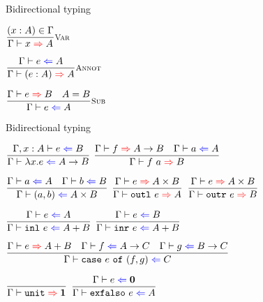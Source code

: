 \documentclass{beamer}
\newcommand{\Fun}[2]{#1 \to #2}
\newcommand{\Prod}[2]{#1 \times #2}
\newcommand{\Sum}[2]{#1 + #2}
\newcommand{\Unit}{\textbf{1}}
\newcommand{\Empty}{\textbf{0}}
\newcommand{\annot}[2]{(#1 : #2)}
\newcommand{\fun}[2]{\lambda #1. #2}
\newcommand{\app}[2]{#1\ #2}
\newcommand{\pair}[2]{(#1, #2)}
\newcommand{\outl}[1][]{\texttt{outl}\ #1}
\newcommand{\outr}[1][]{\texttt{outr}\ #1}
\newcommand{\inl}[1][]{\texttt{inl}\ #1}
\newcommand{\inr}[1][]{\texttt{inr}\ #1}
\newcommand{\case}[3]{\texttt{case}\ #1\ \texttt{of}\ (#2, #3)}
\newcommand{\unit}{\texttt{unit}}
\newcommand{\exfalso}[1][]{\texttt{exfalso}\ #1}
\newcommand{\infrule}[3][]{\displaystyle \frac{#2}{#3} \textsc{\footnotesize{#1}}}
\newcommand{\extend}[3]{#1, #2 : #3}
\newcommand{\sidecond}[1]{#1}
\begin{document}
\newcommand{\fullinfer}[3]{#1 \vdash #2 \mathcolor{red}{\Rightarrow} #3}
\newcommand{\infer}[2]{\fullinfer{\Gamma}{#1}{#2}}

\begin{frame}{Bidirectional typing}

\begin{center}
  $\infrule[Var]{\sidecond{(x : A) \in \Gamma}}{\infer{x}{A}}$

  \vspace{2em}

  $\infrule[Annot]{\check{e}{A}}{\infer{\annot{e}{A}}{A}}$

  \vspace{2em}

  $\infrule[Sub]{\infer{e}{B} \quad \sidecond{A = B}}{\check{e}{A}}$
\end{center}

\end{frame}

\begin{frame}{Bidirectional typing}

\begin{center}
  $\infrule{\fullcheck{\extend{\Gamma}{x}{A}}{e}{B}}{\check{\fun{x}{e}}{\Fun{A}{B}}}$ \quad
  $\infrule{\infer{f}{\Fun{A}{B}} \quad \check{a}{A}}{\infer{\app{f}{a}}{B}}$

  \vspace{2em}

  $\infrule{\check{a}{A} \quad \check{b}{B}}{\check{\pair{a}{b}}{\Prod{A}{B}}}$ \quad
  $\infrule{\infer{e}{\Prod{A}{B}}}{\infer{\outl[e]}{A}}$ \quad
  $\infrule{\infer{e}{\Prod{A}{B}}}{\infer{\outr[e]}{B}}$

  \vspace{2em}

  $\infrule{\check{e}{A}}{\check{\inl[e]}{\Sum{A}{B}}}$ \quad
  $\infrule{\check{e}{B}}{\check{\inr[e]}{\Sum{A}{B}}}$

  \vspace{2em}

  $\infrule{\infer{e}{\Sum{A}{B}} \quad \check{f}{\Fun{A}{C}} \quad \check{g}{\Fun{B}{C}}}{\check{\case{e}{f}{g}}{C}}$

  \vspace{2em}

  $\infrule{}{\infer{\unit}{\Unit}}$ \quad
  $\infrule{\check{e}{\Empty}}{\check{\exfalso[e]}{A}}$
\end{center}

\end{frame}
\end{document}
